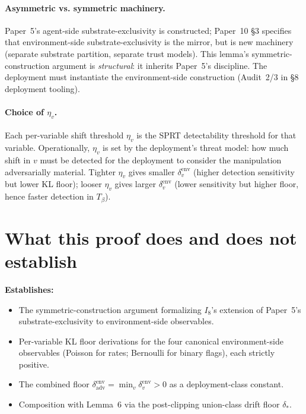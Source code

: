 \documentclass{article}
\newcommand{\deltaadv}{\delta_{\mathrm{adv}}}
\newcommand{\deltastar}{\delta_{*}}
\newcommand{\Tbeta}{T_{\beta}}
\begin{document}
\paragraph{Asymmetric vs. symmetric machinery.}
Paper~5's agent-side substrate-exclusivity is constructed; Paper~10
§3 specifies that environment-side substrate-exclusivity is the
mirror, but is new machinery (separate substrate partition, separate
trust models).  This lemma's symmetric-construction argument is
\emph{structural}: it inherits Paper~5's discipline.  The
deployment must instantiate the environment-side construction
(Audit~2/3 in §8 deployment tooling).

\paragraph{Choice of $\eta_v$.}
Each per-variable shift threshold $\eta_v$ is the SPRT
detectability threshold for that variable.  Operationally, $\eta_v$
is set by the deployment's threat model: how much shift in $v$
must be detected for the deployment to consider the manipulation
adversarially material.  Tighter $\eta_v$ gives smaller
$\delta_v^{\mathrm{env}}$ (higher detection sensitivity but lower
KL floor); looser $\eta_v$ gives larger $\delta_v^{\mathrm{env}}$
(lower sensitivity but higher floor, hence faster detection in
$\Tbeta$).

\section{What this proof does and does not establish}

\textbf{Establishes:}
\begin{itemize}
\item The symmetric-construction argument formalizing $I_8$'s
  extension of Paper~5's substrate-exclusivity to environment-side
  observables.
\item Per-variable KL floor derivations for the four canonical
  environment-side observables (Poisson for rates; Bernoulli for
  binary flags), each strictly positive.
\item The combined floor $\deltaadv^{\mathrm{env}} = \min_v
  \delta_v^{\mathrm{env}} > 0$ as a deployment-class constant.
\item Composition with Lemma~6 via the post-clipping union-class
  drift floor $\deltastar$.
\end{itemize}
\end{document}
